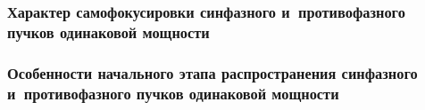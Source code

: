 \documentclass[fullscreen=true,unicode,bookmarks=true]{beamer}
\begin{document}
    \begin{frame}
        \frametitle{Характер самофокусировки синфазного и~противофазного пучков одинаковой мощности}

        \begin{figure}
        \end{figure}
    \end{frame}

    \begin{frame}
        \frametitle{Особенности начального этапа распространения синфазного и~противофазного пучков одинаковой мощности}

	        \begin{figure}
	        \end{figure}
    \end{frame}
\end{document}
